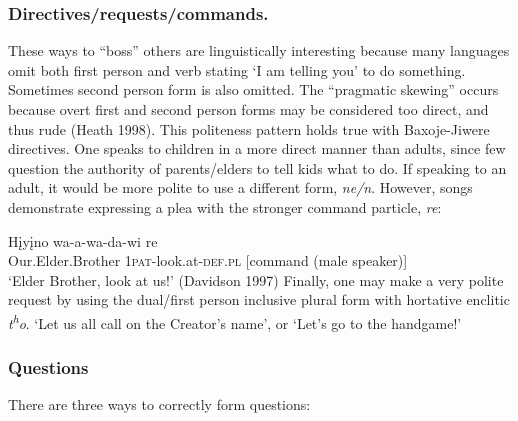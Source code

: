 \documentclass[output=paper]{LSP/langsci}
\begin{document}
\subsubsection{Directives/requests/commands.}  These ways to ``boss'' others are linguistically interesting because many languages omit both first person and verb stating `I am telling you' to do something.  Sometimes second person form is also omitted. The ``pragmatic skewing'' occurs because overt first and second person forms may be considered too direct, and thus rude (Heath 1998). This politeness pattern holds true with Baxoje-Jiwere directives. One speaks to children in a more direct manner than adults, since few question the authority of parents/elders to tell kids what to do.  If speaking to an adult, it would be more polite to use a different form, \textit{ne/n}.  However, songs demonstrate expressing a plea with the stronger command particle, \textit{re}: 	     											

\ea \gll H\k{i}y\k{i}no    		 wa-a-wa-da-wi          re 	\\                                  	 
Our.Elder.Brother 1\textsc{pat}-look.at-\textsc{def.pl}  [command (male speaker)]	 \\	   	    
\trans `Elder Brother, look at us!'  (Davidson 1997)  	
\z				             
Finally, one may make a very polite request by using the dual/first person inclusive plural form with hortative enclitic \textit{t\textsuperscript{h}o}. `Let us all call on the Creator's name', or `Let's go to the handgame!'  		

\subsubsection{Questions} There are three ways to correctly form questions:  	
	          			
\end{document}
